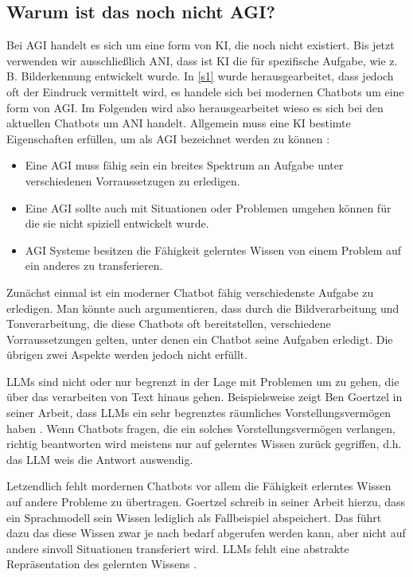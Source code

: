 	
	\subsection{Warum ist das noch nicht AGI?}\label{s2ss3}
	Bei AGI handelt es sich um eine form von KI, die noch nicht existiert. Bis jetzt verwenden wir ausschließlich 
	ANI, dass ist KI die für spezifische Aufgabe, wie z. B. Bilderkennung entwickelt wurde. In \ref{s1} wurde 
	herausgearbeitet, dass jedoch oft der Eindruck vermittelt wird, es handele sich bei modernen Chatbots um 
	eine form von AGI. Im Folgenden wird also herausgearbeitet wieso es sich bei den aktuellen Chatbots um ANI 
	handelt.  
	Allgemein muss eine KI bestimte Eigenschaften erfüllen, um als AGI bezeichnet werden zu können \cite[S. 8]{goertzel23}:
	\begin{itemize}
	\item Eine AGI muss fähig sein ein breites Spektrum an Aufgabe unter verschiedenen Vorraussetzugen zu erledigen. 
	\item Eine AGI sollte auch mit Situationen oder Problemen umgehen können für die sie nicht spiziell entwickelt wurde. 
	\item AGI Systeme besitzen die Fähigkeit gelerntes Wissen von einem Problem auf ein anderes zu transferieren. 
	\end{itemize}	
	Zunächst einmal ist ein moderner Chatbot fähig verschiedenste Aufgabe zu erledigen. Man könnte auch argumentieren,
	dass durch die Bildverarbeitung und Tonverarbeitung, die diese Chatbots oft bereitstellen, verschiedene Vorraussetzungen 
	gelten, unter denen ein Chatbot seine Aufgaben erledigt. Die übrigen zwei Aspekte werden jedoch nicht erfüllt. 
	
	LLMs sind nicht oder nur begrenzt in der Lage mit Problemen um zu gehen, die über das verarbeiten von Text hinaus gehen. 
	Beispielsweise zeigt Ben Goertzel in seiner Arbeit, dass LLMs ein sehr begrenztes räumliches Vorstellungsvermögen haben 
	\cite[S. 32-35]{goertzel23}. Wenn Chatbots fragen, die ein solches Vorstellungsvermögen verlangen, richtig beantworten 
	wird meistens nur auf gelerntes Wissen zurück gegriffen, d.h. das LLM weis die Antwort auswendig.
	
	Letzendlich fehlt mordernen Chatbots vor allem die Fähigkeit erlerntes Wissen auf andere Probleme zu übertragen. Goertzel schreib in
	seiner Arbeit hierzu, dass ein Sprachmodell sein Wissen lediglich als Fallbeispiel abspeichert. Das führt dazu das diese Wissen
	zwar je nach bedarf abgerufen werden kann, aber nicht auf andere sinvoll Situationen transferiert wird. LLMs fehlt eine 
	abstrakte Repräsentation des gelernten Wissens \cite[S. 81f]{goertzel23}. 
	
